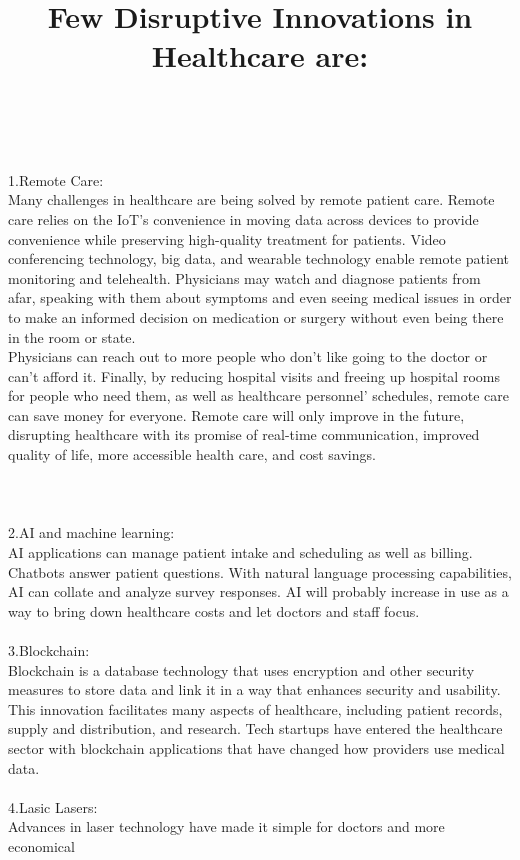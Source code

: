 \documentclass[a4paper,12pt]{article}
\begin{document}
	{ \centering \title {Few Disruptive Innovations in Healthcare are:}}
	\\
	\\
	1.Remote Care:
	\\
	Many challenges in healthcare are being solved by remote patient care. Remote care
	relies on the IoT’s convenience in moving data across devices to provide convenience
	while preserving high-quality treatment for patients. Video conferencing technology,
	big data, and wearable technology enable remote patient monitoring and telehealth.
	Physicians may watch and diagnose patients from afar, speaking with them about
	symptoms and even seeing medical issues in order to make an informed decision on
	medication or surgery without even being there in the room or state.
	\\
	Physicians can reach out to more people who don’t like going to the doctor or can’t
	afford it. Finally, by reducing hospital visits and freeing up hospital rooms for
	people who need them, as well as healthcare personnel’ schedules, remote care can
	save money for everyone. Remote care will only improve in the future, disrupting
	healthcare with its promise of real-time communication, improved quality of life,
	more accessible health care, and cost savings.
	\\
	\\
	\\
	\\
	2.AI and machine learning:
	\\
	AI applications can manage patient intake and scheduling as well as billing.
	Chatbots answer patient questions. With natural language processing capabilities, AI can collate and analyze survey responses. AI will probably increase
	in use as a way to bring down healthcare costs and let doctors and staff focus.
	\\
	\\
	3.Blockchain:
	\\
	Blockchain is a database technology that uses encryption and other security
	measures to store data and link it in a way that enhances security and usability. This innovation facilitates many aspects of healthcare, including patient
	records, supply and distribution, and research. Tech startups have entered the
	healthcare sector with blockchain applications that have changed how providers
	use medical data.
	\\
	\\
	4.Lasic Lasers:
	\\
	Advances in laser technology have made it simple for doctors and more economical
\end{document}
